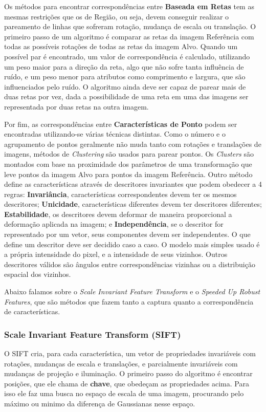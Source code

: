     Os métodos para encontrar correspondências entre \textbf{Baseada em Retas} tem as mesmas restrições que os
de Região, ou seja, devem conseguir realizar o pareamento de linhas que sofreram rotação, mudança de escala ou
translação. O primeiro passo de um algoritmo é comparar as retas da imagem Referência com todas as possíveis rotações
de todas as retas da imagem Alvo. Quando um possível par é encontrado, um valor de correspondência é calculado,
utilizando um peso maior para a direção da reta, algo que não sofre tanta influência de ruído, e um peso menor para
atributos como comprimento e largura, que são influenciados pelo ruído. O algoritmo ainda deve ser capaz de parear mais
de duas retas por vez, dada a possibilidade de uma reta em uma das imagens ser representada por duas retas na outra
imagem.

    Por fim, as correspondências entre \textbf{Características de Ponto} podem ser encontradas utilizando-se várias
técnicas distintas. Como o número e o agrupamento de pontos geralmente não muda tanto com rotações e translações de
imagens, métodos de \textit{Clustering} são usados para parear pontos. Os \textit{Clusters} são montados com base na
proximidade dos parâmetros de uma transformação que leve pontos da imagem Alvo para pontos da imagem Referência. Outro
método define as características através de descritores invariantes que podem obedecer a 4 regras: \textbf{Invariância},
características correspondentes devem ter os mesmos descritores; \textbf{Unicidade}, características diferentes devem
ter descritores diferentes; \textbf{Estabilidade}, os descritores devem deformar de maneira proporcional a deformação
aplicada na imagem; e \textbf{Independência}, se o descritor for representado por um vetor, seus componentes devem ser
independentes. O que define um descritor deve ser decidido caso a caso. O modelo mais simples usado é a própria
intensidade do pixel, e a intensidade de seus vizinhos. Outros descritores válidos são ângulos entre correspondências
vizinhas ou a distribuição espacial dos vizinhos.

  Abaixo falamos sobre o \textit{Scale Invariant Feature Transform} e o \textit{Speeded Up Robust Features}, que são
métodos que fazem tanto a captura quanto a correspondência de características.

\subsubsection{Scale Invariant Feature Transform (SIFT)}
  O SIFT cria, para cada característica, um vetor de propriedades invariáveis com rotações, mudanças de escala e
translações, e parcialmente invariáveis com mudanças de projeção e iluminação. O primeiro passo do algoritmo é encontrar
posições, que ele chama de \textbf{chave}, que obedeçam as propriedades acima. Para isso ele faz uma busca no espaço
de escala de uma imagem, procurando pelo máximo ou minimo da diferença de Gaussianas nesse espaço.

